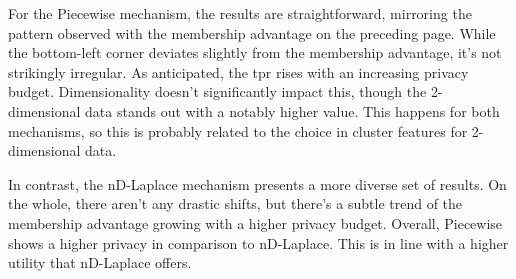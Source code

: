 For the Piecewise mechanism, the results are straightforward, mirroring the pattern observed with the membership advantage on the preceding page. While the bottom-left corner deviates slightly from the membership advantage, it's not strikingly irregular. As anticipated, the \gls{tpr} rises with an increasing privacy budget. Dimensionality doesn't significantly impact this, though the 2-dimensional data stands out with a notably higher value. 
This happens for both mechanisms, so this is probably related to the choice in cluster features for 2-dimensional data.

In contrast, the nD-Laplace mechanism presents a more diverse set of results. On the whole, there aren't any drastic shifts, but there's a subtle trend of the membership advantage growing with a higher privacy budget. %
Overall, Piecewise shows a higher privacy in comparison to nD-Laplace. This is in line with a higher utility that nD-Laplace offers.
\newpage

